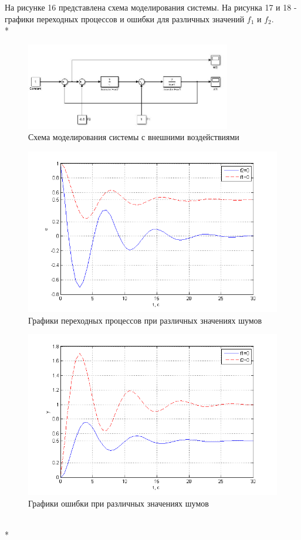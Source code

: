 \documentclass[a4paper, 12pt]{article}
\begin{document}
На рисунке 16 представлена схема моделирования системы. На рисунка 17 и 18 - графики переходных процессов и ошибки для различных значений $f_1$ и $f_2$.\\*
\begin{figure}[h!]
	\centering
	\includegraphics[width = 0.8\textwidth]{sxema6}
	\caption{Схема моделирования системы с внешними воздействиями}
\end{figure}
\begin{figure}[h!]
	\centering
	\includegraphics[width = 1\textwidth]{hinh11}
	\caption{Графики переходных процессов при различных значениях шумов}
\end{figure}
\newpage
\begin{figure}[h!]
	\centering
	\includegraphics[width = 1\textwidth]{hinh12}
	\caption{Графики ошибки при различных значениях шумов}
\end{figure}\hfill\\*
\end{document}
